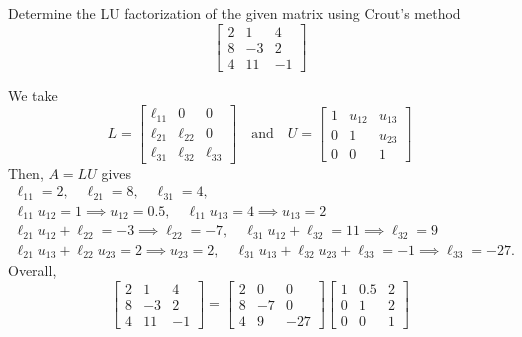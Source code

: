 \documentclass[11pt]{penrose}
\begin{document}
\begin{problem}{2}
    Determine the LU factorization of the given matrix using Crout's method
    \begin{equation*}
        \begin{bmatrix*} 2 & 1 & 4 \\ 8 & -3 & 2 \\ 4 & 11 & -1 \end{bmatrix*}
    \end{equation*}

    \solution We take
    \begin{equation*}
        L = \begin{bmatrix*} \ell_{11} & 0 & 0 \\ \ell_{21} & \ell_{22} & 0 \\ \ell_{31} & \ell_{32} & \ell_{33} \end{bmatrix*}
        \quad\text{and}\quad
        U = \begin{bmatrix*} 1 & u_{12} & u_{13} \\ 0 & 1 & u_{23} \\ 0 & 0 & 1 \end{bmatrix*}
    \end{equation*}
    Then, $A = LU$ gives
    \begin{gather*}
        \ell_{11} = 2, \quad \ell_{21} = 8, \quad \ell_{31} = 4,\\
        \ell_{11} u_{12} = 1 \implies u_{12} = 0.5, \quad \ell_{11} u_{13} = 4 \implies u_{13} = 2\\
        \ell_{21} u_{12} + \ell_{22} = -3 \implies \ell_{22} = -7, \quad \ell_{31} u_{12} + \ell_{32} = 11 \implies \ell_{32} = 9\\
        \ell_{21} u_{13} + \ell_{22} u_{23} = 2 \implies u_{23} = 2, \quad \ell_{31} u_{13} + \ell_{32} u_{23} + \ell_{33} = -1 \implies \ell_{33} = -27.
    \end{gather*}
    Overall,
    \begin{equation*}
        \begin{bmatrix*} 2 & 1 & 4 \\ 8 & -3 & 2 \\ 4 & 11 & -1 \end{bmatrix*}
        = \begin{bmatrix*} 2 & 0 & 0 \\ 8 & -7 & 0 \\ 4 & 9 & -27 \end{bmatrix*}
        \begin{bmatrix*} 1 & 0.5 & 2 \\ 0 & 1 & 2 \\ 0 & 0 & 1 \end{bmatrix*}
    \end{equation*}
\end{problem}
\end{document}
